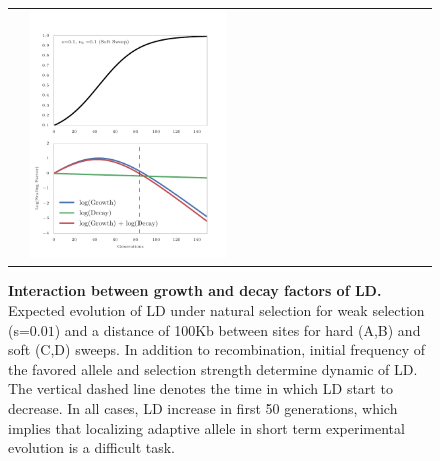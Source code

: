 \begin{figure}[H]
\begin{tabular}{l|l}
		&\includegraphics[width=0.5\textwidth]{figures/decayFactors3}		
	\end{tabular}
	
	\caption{{\bf Interaction between growth and decay factors of LD.}
		Expected evolution of LD under natural 
		selection for weak selection (s=$0.01$) and a distance of 100Kb between 
		sites for hard (A,B) and soft (C,D) sweeps. In addition to 
		recombination, initial frequency of the favored allele and selection 
		strength determine dynamic of LD. The vertical dashed line denotes the 
		time in which LD start to decrease. In all cases, LD increase in first 
		50 generations, which implies that localizing adaptive allele in short 
		term experimental evolution is a difficult task.} \label{fig:ldf}
\end{figure}



